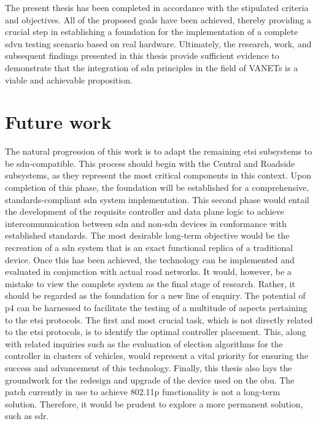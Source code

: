 The present thesis has been completed in accordance with the stipulated criteria and objectives. All of the proposed goals have been achieved, thereby providing a crucial step in establishing a foundation for the implementation of a complete \gls{sdvn} testing scenario based on real hardware. Ultimately, the research, work, and subsequent findings presented in this thesis provide sufficient evidence to demonstrate that the integration of \gls{sdn} principles in the field of VANETs is a viable and achievable proposition.

\section{Future work}
The natural progression of this work is to adapt the remaining \gls{etsi} subsystems to be \gls{sdn}-compatible. This process should begin with the Central and Roadside subsystems, as they represent the most critical components in this context. 
Upon completion of this phase, the foundation will be established for a comprehensive, standards-compliant \gls{sdn} system implementation. This second phase would entail the development of the requisite controller and data plane logic to achieve intercommunication between \gls{sdn} and non-\gls{sdn} devices in conformance with established standards.
The most desirable long-term objective would be the recreation of a \gls{sdn} system that is an exact functional replica of a traditional device. Once this has been achieved, the technology can be implemented and evaluated in conjunction with actual road networks.
It would, however, be a mistake to view the complete system as the final stage of research. Rather, it should be regarded as the foundation for a new line of enquiry. The potential of \gls{p4} can be harnessed to facilitate the testing of a multitude of aspects pertaining to the \gls{etsi} protocols. The first and most crucial task, which is not directly related to the \gls{etsi} protocols, is to identify the optimal controller placement. This, along with related inquiries such as the evaluation of election algorithms for the controller in clusters of vehicles, would represent a vital priority for ensuring the success and advancement of this technology.
Finally, this thesis also lays the groundwork for the redesign and upgrade of the device used on the \gls{obu}. The patch currently in use to achieve 802.11p functionality is not a long-term solution. Therefore, it would be prudent to explore a more permanent solution, such as \gls{sdr}.
